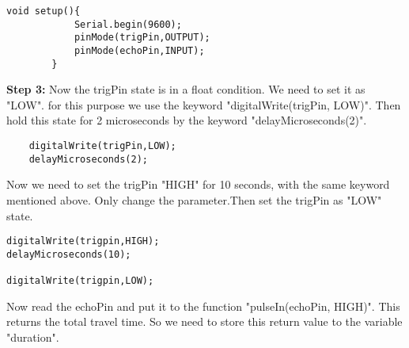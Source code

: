 \lstset{basicstyle=\footnotesize}
\begin{lstlisting}
void setup(){
  			Serial.begin(9600);
 			pinMode(trigPin,OUTPUT);
  			pinMode(echoPin,INPUT);
 		}
\end{lstlisting}

\textbf{Step 3:}
    Now the trigPin state is in a float condition. We need to set it as "LOW". for this purpose we use the keyword "digitalWrite(trigPin, LOW)". Then hold this state for 2 microseconds by the keyword "delayMicroseconds(2)".\\
\lstset{language=Python}
\lstset{frame=lines}

\lstset{basicstyle=\footnotesize}
\begin{lstlisting}
    digitalWrite(trigPin,LOW);
	delayMicroseconds(2);

\end{lstlisting}

    Now we need to set the trigPin "HIGH" for 10 seconds, with the same keyword mentioned above. Only change the parameter.Then set the trigPin as "LOW" state.
\lstset{language=Python}
\lstset{frame=lines}

\lstset{basicstyle=\footnotesize}
\begin{lstlisting}
digitalWrite(trigpin,HIGH);
delayMicroseconds(10);

digitalWrite(trigpin,LOW);

\end{lstlisting}
Now read the echoPin and put it to the function "pulseIn(echoPin, HIGH)". This returns the total travel time. So we need to store this return value to the variable "duration".\\

